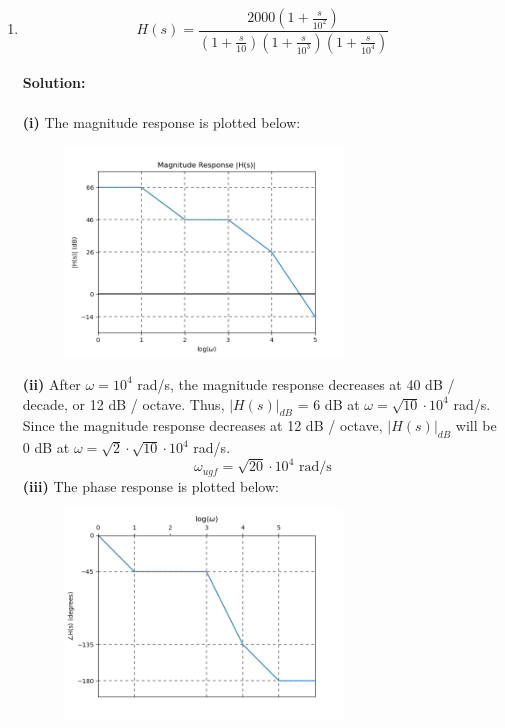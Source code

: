 \documentclass{article}
\begin{document}
\begin{enumerate}[label=\textbf{(\alph*)}]
\begin{figure}[!h]
    \end{figure}
    \item $$H(s) = \frac{2000\left(1 + \frac{s}{10^2}\right)}{\left(1 + \frac{s}{10}\right)\left(1 + \frac{s}{10^3}\right)\left(1 + \frac{s}{10^4}\right)}$$
    \\ \textbf{Solution:}\\ \\
    \textbf{(i)} The magnitude response is plotted below:
    \begin{figure}[!h]
    \centering
    \includegraphics[width=0.7\textwidth]{figures/ece342_cc_mag.png}
    \end{figure} \newpage
    \textbf{(ii)} After $\omega = 10^4$ rad/s, the magnitude response decreases at 40 dB / decade, or 12 dB / octave.  Thus, $|H(s)|_{dB}$ =  6 dB at $\omega = \sqrt{10} \cdot 10^4$ rad/s.  Since the magnitude response decreases at 12 dB / octave, $|H(s)|_{dB}$ will be 0 dB at $\omega = \sqrt{2} \cdot \sqrt{10} \cdot 10^4$ rad/s.
    $$\boxed{\omega_{ugf} = \sqrt{20} \cdot 10^4 \text{ rad/s}}$$
    \textbf{(iii)} The phase response is plotted below:
    \begin{figure}[!h]
    \centering
    \includegraphics[width=0.7\textwidth]{figures/ece342_cc_phaseresponse.png}

\end{figure}
\end{enumerate}
\end{document}
